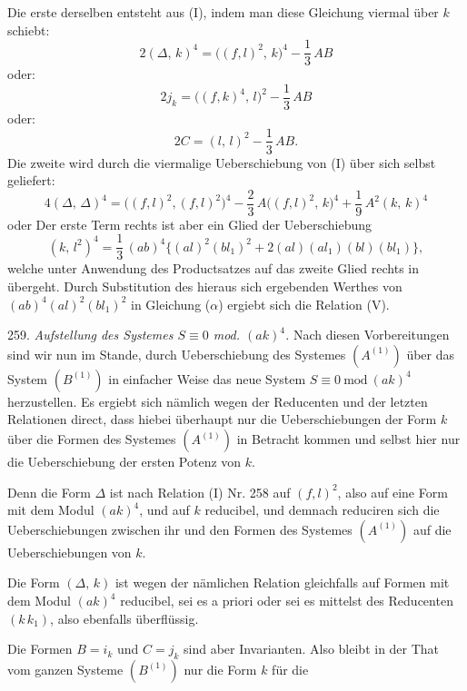 
Die erste derselben entsteht aus (I), indem man diese Gleichung viermal
über $k$ schiebt:
\[
2(\varDelta,\,k)^4 = \big((f,l)^2,\,k\big)^4 - \frac{1}{3}\,AB
\]
oder:
\[
2j_k = \big((f,k)^4,\,l\big)^2 - \frac{1}{3}\,AB
\]
oder:
\[
2C = (l,\,l)^2 - \frac{1}{3}\,AB.
\]
Die zweite wird durch die viermalige Ueberschiebung von (I) über sich
selbst geliefert:
\[
4(\varDelta,\,\varDelta)^4 = \big((f,l)^2,(f,l)^2\big)^4 -
\frac{2}{3}\,A\big((f,l)^2,\,k\big)^4 + \frac{1}{9}\,A^2(k,\,k)^4
\]
oder
Der erste Term rechts ist aber ein Glied der Ueberschiebung
\[
(k,\,l^2)^4 = \frac{1}{3}\,(ab)^4\big\{(al)^2(bl_1)^2 + 2(al)(al_1)(bl)(bl_1)\big\},
\]
welche unter Anwendung des Productsatzes auf das zweite Glied rechts in
übergeht. Durch Substitution des hieraus sich ergebenden Werthes von
$(ab)^4(al)^2(bl_1)^2$ in Gleichung ($\alpha$) ergiebt sich die
Relation (V).

259. \textit{Aufstellung des Systemes $S\equiv 0$ mod. $(ak)^4$.} Nach
diesen Vorbereitungen sind wir nun im Stande, durch Ueberschiebung des
Systemes $(A^{(1)})$ über das System $(B^{(1)})$ in einfacher Weise das
neue System $S\equiv 0\ \mathrm{mod}\ (ak)^4$ herzustellen. Es ergiebt
sich nämlich wegen der Reducenten und der letzten Relationen direct,
dass hiebei überhaupt nur die Ueberschiebungen der Form $k$ über die
Formen des Systemes $(A^{(1)})$ in Betracht kommen und selbst hier nur
die Ueberschiebung der ersten Potenz von $k$.

Denn die Form $\varDelta$ ist nach Relation (I) Nr. 258 auf $(f,l)^2$,
also auf eine Form mit dem Modul $(ak)^4$, und auf $k$ reducibel, und
demnach reduciren sich die Ueberschiebungen zwischen ihr und den Formen
des Systemes $(A^{(1)})$ auf die Ueberschiebungen von $k$.

Die Form $(\varDelta,\,k)$ ist wegen der nämlichen Relation gleichfalls
auf Formen mit dem Modul $(ak)^4$ reducibel, sei es a priori oder sei es
mittelst des Reducenten $(k\,k_1)$, also ebenfalls überflüssig.

Die Formen $B=i_k$ und $C=j_k$ sind aber Invarianten. Also bleibt in der
That vom ganzen Systeme $(B^{(1)})$ nur die Form $k$ für die


